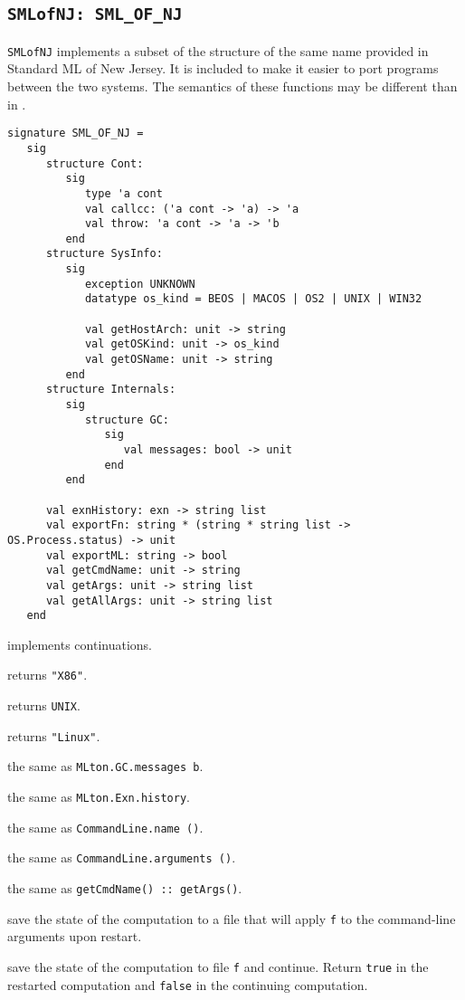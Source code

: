 \subsection{{\tt SMLofNJ: SML\_OF\_NJ}}

{\tt SMLofNJ} implements a subset of the structure of the same name
provided in Standard ML of New Jersey.  It is included to make it
easier to port programs between the two systems.  The semantics of
these functions may be different than in {\smlnj}.

\begin{verbatim}
signature SML_OF_NJ =
   sig
      structure Cont:
         sig
            type 'a cont
            val callcc: ('a cont -> 'a) -> 'a
            val throw: 'a cont -> 'a -> 'b
         end
      structure SysInfo:
         sig
            exception UNKNOWN
            datatype os_kind = BEOS | MACOS | OS2 | UNIX | WIN32

            val getHostArch: unit -> string
            val getOSKind: unit -> os_kind
            val getOSName: unit -> string
         end
      structure Internals:
         sig
            structure GC:
               sig
                  val messages: bool -> unit
               end             
         end

      val exnHistory: exn -> string list
      val exportFn: string * (string * string list -> OS.Process.status) -> unit
      val exportML: string -> bool
      val getCmdName: unit -> string
      val getArgs: unit -> string list
      val getAllArgs: unit -> string list
   end
\end{verbatim}

\begin{description}

 implements continuations.

returns {\tt "X86"}.

returns {\tt UNIX}.

returns {\tt "Linux"}.

the same as {\tt MLton.GC.messages b}.

the same as {\tt MLton.Exn.history}.

the same as {\tt CommandLine.name ()}.

the same as {\tt CommandLine.arguments ()}.

the same as {\tt getCmdName() :: getArgs()}.

save the state of the computation to a file that will apply {\tt f} to
the command-line arguments upon restart.

save the state of the computation to file {\tt f} and continue.
Return {\tt true} in the restarted computation and {\tt false} in the
continuing computation.

\end{description}

